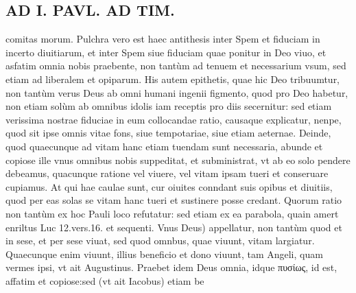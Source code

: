 \documentclass{article}
\begin{document}
\begin{pages}
\section*{AD I. PAVL. AD TIM. }
\marginpar{[ p.330) ]}\pstart comitas morum.  \pend\pstart Pulchra vero est haec antithesis inter Spem et fiduciam in incerto diuitiarum, et inter Spem siue fiduciam quae ponitur in Deo viuo, et asfatim omnia nobis praebente, non tantùm ad tenuem et necessarium vsum, sed etiam ad liberalem et opiparum. His autem epithetis, quae hic Deo tribuumtur, non tantùm verus Deus ab omni humani ingenii figmento, quod pro Deo habetur, non etiam solùm ab omnibus idolis iam receptis pro diis secernitur: sed etiam verissima nostrae fiduciae in eum collocandae ratio, causaque explicatur, nenpe, quod sit ipse omnis vitae fons, siue tempotariae, siue etiam aeternae. Deinde, quod quaecunque ad vitam hanc etiam tuendam sunt necessaria, abunde et copiose ille vnus omnibus nobis suppeditat, et subministrat, vt ab eo solo pendere debeamus, quacunque ratione vel viuere, vel vitam ipsam tueri et conseruare cupiamus. At qui hae caulae sunt, cur oiuites conndant suis opibus et diuitiis, quod per eas solas se vitam hanc tueri et sustinere posse credant. Quorum ratio non tantùm ex hoc Pauli loco refutatur: sed etiam ex ea parabola, quain amert enriltus Luc 12.vers.16. et sequenti.  \pend\pstart Vnus Deus) appellatur, non tantùm quod et in sese, et per sese viuat, sed quod omnbus, quae viuunt, vitam largiatur. Quaecunque enim viuunt, illius beneficio et dono viuunt, tam Angeli, quam vermes ipsi, vt ait Augustinus.  \pend\pstart Praebet idem Deus omnia, idque πυσίως, id est, affatim et copiose:sed (vt ait Iacobus) etiam be\pend

\end{pages}
\end{document}
